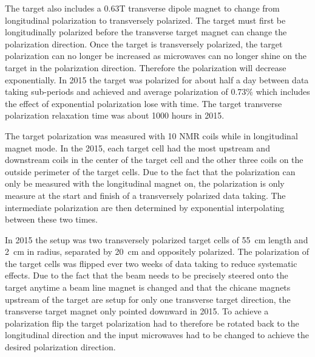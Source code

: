 The target also includes a 0.63T transverse dipole magnet to change from
longitudinal polarization to transversely polarized.  The target must first be
longitudinally polarized before the transverse target magnet can change the
polarization direction.  Once the target is transversely polarized, the target
polarization can no longer be increased as microwaves can no longer shine on the
target in the polarization direction.  Therefore the polarization will decrease
exponentially.  In 2015 the target was polarized for about half a day between
data taking sub-periods and achieved and average polarization of 0.73\% which
includes the effect of exponential polarization lose with time.  The target
transverse polarization relaxation time was about 1000 hours in 2015. \par

The target polarization was measured with 10 NMR coils while in longitudinal
magnet mode.  In the 2015, each target cell had the most upstream and downstream
coils in the center of the target cell and the other three coils on the outside
perimeter of the target cells.  Due to the fact that the polarization can only
be measured with the longitudinal magnet on, the polarization is only measure at
the start and finish of a transversely polarized data taking.  The intermediate
polarization are then determined by exponential interpolating between these two
times.

In 2015 the setup was two transversely polarized target cells of 55~cm length
and 2~cm in radius, separated by 20~cm and oppositely polarized.  The
polarization of the target cells was flipped ever two weeks of data taking to
reduce systematic effects.  Due to the fact that the beam needs to be precisely
steered onto the target anytime a beam line magnet is changed and that the
chicane magnets upstream of the target are setup for only one transverse target
direction, the transverse target magnet only pointed downward in 2015.  To
achieve a polarization flip the target polarization had to therefore be rotated
back to the longitudinal direction and the input microwaves had to be changed to
achieve the desired polarization direction. \par

